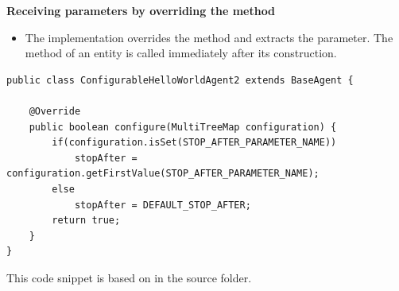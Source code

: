 \documentclass[10pt,aspectratio=169]{beamer}
\begin{document}
\begin{frame}[fragile]

\textbf{Receiving parameters by overriding the  method}

\begin{itemize}
    \item The implementation overrides the  method and extracts the  parameter. The  method of an entity is called immediately after its construction.
\end{itemize}

\begin{lstlisting}
public class ConfigurableHelloWorldAgent2 extends BaseAgent {

	@Override
	public boolean configure(MultiTreeMap configuration) {
		if(configuration.isSet(STOP_AFTER_PARAMETER_NAME))
			stopAfter = configuration.getFirstValue(STOP_AFTER_PARAMETER_NAME);
		else
			stopAfter = DEFAULT_STOP_AFTER;
		return true;
	}
}
\end{lstlisting}


{\small This code snippet is based on  in the  source folder.}

\end{frame}



\end{document}
